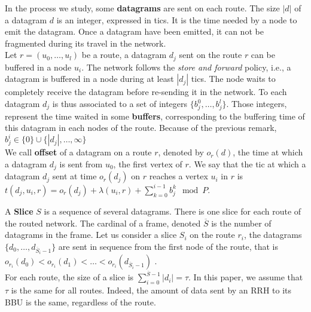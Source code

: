 \documentclass[10pt]{article}
\begin{document}
        In the process we study, some {\bf datagrams} are sent on each route. The size $|d|$ of a datagram $d$ is an integer, expressed in tics. It is the time needed by a node to emit the datagram. Once a datagram have been emitted, it can not be fragmented during its travel in the network. \\
          Let $r=(u_0,\dots,u_l)$ be a route, a datagram $d_j$ sent on the route $r$ can be buffered in a node $u_i$. The network follows the {\em store and forward} policy, i.e., a datagram is buffered in a node during at least $|d_j|$ tics. The node waits to completely receive the datagram before re-sending it in the network. To each datagram $d_j$ is thus associated to a set of integers $\{b_j^0,\ldots,b_j^l\}$. Those integers, represent the time waited in some \textbf{buffers}, corresponding to the buffering time of this datagram in each nodes of the route. Because of the previous remark, $b_j^i \in \{0\} \cup \{|d_j|, \ldots,\infty\}$\\
          We call \textbf{offset} of a datagram on a route  $r$, denoted by $o_r(d)$, the time at which a datagram $d_j$ is sent from $u_0$, the first vertex of $r$. We say that the tic at which a datagram $d_j$ sent at time $o_r(d_j)$ on $r$ reaches a vertex $u_i$ in $r$ is $t(d_j,u_i,r) = o_r(d_j) + \lambda(u_i,r) + \sum_{k=0}^{i-1}b_j^k \mod P$.
   
        A {\bf Slice} $S$ is a sequence of several datagrams. There is one slice for each route of the routed network. The cardinal of a frame, denoted $\overline S$ is the number of datagrams in the frame. Let us consider a slice $S_i$ on the route $r_i$, the datagrams $\{d_0,\ldots,d_{\overline S_i-1}\}$ are sent in sequence from the first node of the route, that is $o_{r_i}(d_0) < o_{r_i}(d_1) < \ldots < o_{r_i}(d_{\overline S_i-1})$ . \\
       For each route, the size of a slice is $\sum_{i=0}^{{\overline S-1}} |d_i| = \tau$. In this paper, we assume that $\tau$ is the same for all routes. Indeed, the amount of data sent by an RRH to its BBU is the same, regardless of the route.
        
       
      
\end{document}
